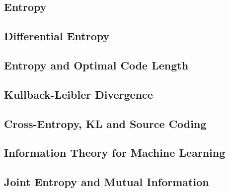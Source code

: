 
\subsection{Entropy}


\subsection{Differential Entropy}


\subsection{Entropy and Optimal Code Length}


\subsection{Kullback-Leibler Divergence}


\subsection{Cross-Entropy, KL and Source Coding}


\subsection{Information Theory for Machine Learning}


\subsection{Joint Entropy and Mutual Information}




